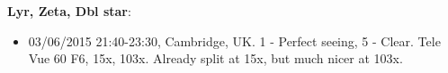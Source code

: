 {\bf Lyr, Zeta, Dbl star}:
\begin{itemize}
\item 03/06/2015 21:40-23:30, Cambridge, UK. 1 - Perfect seeing, 5 - Clear. Tele Vue 60 F6, 15x, 103x. Already split at 15x, but much nicer at 103x. 
\end{itemize}
